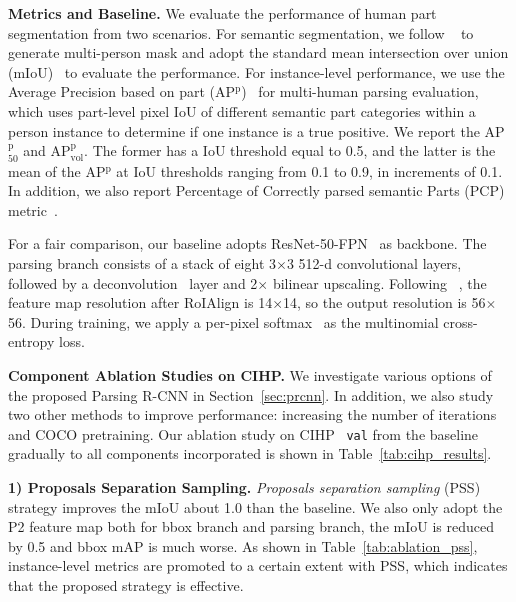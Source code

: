 \documentclass[10pt,twocolumn,letterpaper]{article}
\begin{document}
\vspace{6pt}
\noindent\textbf{Metrics and Baseline.} We evaluate the performance of human part segmentation from two scenarios. For semantic segmentation, we follow ~\cite{Kirillov_arxiv2018_ps} to generate multi-person mask and adopt the standard mean intersection over union (mIoU)~\cite{Long_cvpr2015_fcn} to evaluate the performance. For instance-level performance, we use the Average Precision based on part (AP$^\text{p}$)~\cite{Zhao_mm2018_mhpv2} for multi-human parsing evaluation, which uses part-level pixel IoU of different semantic part categories within a person instance to determine if one instance is a true positive. We report the AP$^\text{p}_\text{50}$ and AP$^\text{p}_\text{vol}$. The former has a IoU threshold equal to 0.5, and the latter is the mean of the AP$^\text{p}$ at IoU thresholds ranging from 0.1 to 0.9, in increments of 0.1. In addition, we also report Percentage of Correctly parsed semantic Parts (PCP) metric~\cite{Zhao_mm2018_mhpv2}. 

For a fair comparison, our baseline adopts ResNet-50-FPN~\cite{He_cvpr2016_resnet, He_eccv2016_identity, Xie_cvpr2017_resnext, Lin_cvpr2017_fpn} as backbone. The parsing branch consists of a stack of eight 3$\times$3 512-d convolutional layers, followed by a deconvolution~\cite{Zeiler_eccv2014_visualizing} layer and 2$\times$ bilinear upscaling. Following ~\cite{He_iccv2017_maskrcnn}, the feature map resolution after RoIAlign is 14$\times$14, so the output resolution is 56$\times$56.  During training, we apply a per-pixel softmax~\cite{Long_cvpr2015_fcn} as the multinomial cross-entropy loss.


\vspace{6pt}
\noindent\textbf{Component Ablation Studies on CIHP.} We investigate various options of the proposed Parsing R-CNN in Section~\ref{sec:prcnn}. In addition, we also study two other methods to improve performance: increasing the number of iterations and COCO pretraining. Our ablation study on CIHP~\cite{Gong_eccv2018_pgn} \texttt{val} from the baseline gradually to all components incorporated is shown in Table~\ref{tab:cihp_results}. 

\vspace{3pt}
\noindent\textbf{1) Proposals Separation Sampling.} \emph{Proposals separation sampling} (PSS) strategy improves the mIoU about 1.0 than the baseline. We also only adopt the P2 feature map both for bbox branch and parsing branch, the mIoU is reduced by 0.5 and bbox mAP is much worse. As shown in Table~\ref{tab:ablation_pss}, instance-level metrics are promoted to a certain extent with PSS, which indicates that the proposed strategy is effective.
\end{document}
